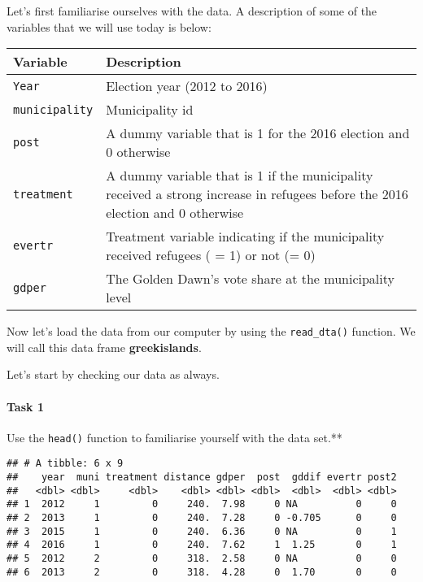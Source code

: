 \documentclass[
]{article}
\begin{document}
Let's first familiarise ourselves with the data. A description of some
of the variables that we will use today is below:

\begin{longtable}[]{@{}
  >{\raggedright\arraybackslash}p{}
  >{\raggedright\arraybackslash}p{}@{}}
\toprule\noalign{}
\begin{minipage}[b]{\linewidth}\raggedright
Variable
\end{minipage} & \begin{minipage}[b]{\linewidth}\raggedright
Description
\end{minipage} \\
\midrule\noalign{}
\endhead
\bottomrule\noalign{}
\endlastfoot
\texttt{Year} & Election year (2012 to 2016) \\
\texttt{municipality} & Municipality id \\
\texttt{post} & A dummy variable that is 1 for the 2016 election and 0
otherwise \\
\texttt{treatment} & A dummy variable that is 1 if the municipality
received a strong increase in refugees before the 2016 election and 0
otherwise \\
\texttt{evertr} & Treatment variable indicating if the municipality
received refugees ( = 1) or not (= 0) \\
\texttt{gdper} & The Golden Dawn's vote share at the municipality
level \\
\end{longtable}

Now let's load the data from our computer by using the
\texttt{read\_dta()} function. We will call this data frame
\textbf{greekislands}.

Let's start by checking our data as always.

\paragraph{Task 1}\label{task-1}

Use the \texttt{head()} function to familiarise yourself with the data
set.**

\begin{verbatim}
## # A tibble: 6 x 9
##    year  muni treatment distance gdper  post  gddif evertr post2
##   <dbl> <dbl>     <dbl>    <dbl> <dbl> <dbl>  <dbl>  <dbl> <dbl>
## 1  2012     1         0     240.  7.98     0 NA          0     0
## 2  2013     1         0     240.  7.28     0 -0.705      0     0
## 3  2015     1         0     240.  6.36     0 NA          0     1
## 4  2016     1         0     240.  7.62     1  1.25       0     1
## 5  2012     2         0     318.  2.58     0 NA          0     0
## 6  2013     2         0     318.  4.28     0  1.70       0     0
\end{verbatim}
\end{document}
